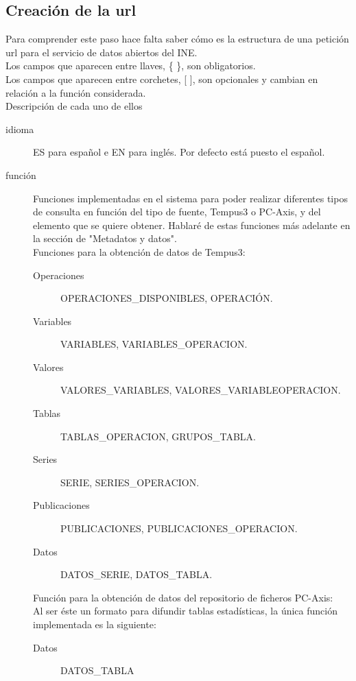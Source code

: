  \subsection{Creación de la url}
 Para comprender este paso hace falta saber cómo es la estructura de una petición url para el servicio de datos abiertos del INE. \cite{ine:urljson}\\
Los campos que aparecen entre llaves, \{ \}, son obligatorios.\\
Los campos que aparecen entre corchetes, [ ], son opcionales y cambian en relación a la función considerada.\\
Descripción de cada uno de ellos
\begin{description}
	\item [idioma] ES para español e EN para inglés. Por defecto está puesto el español.\\
	\item [función] Funciones implementadas en el sistema para poder realizar diferentes tipos de consulta en función del tipo de fuente, Tempus3 o PC-Axis, y del elemento que se quiere obtener. Hablaré de estas funciones más adelante en la sección de "Metadatos y datos".\\
    Funciones para la obtención de datos de Tempus3:
         \begin{description}
         \item [Operaciones] OPERACIONES\_DISPONIBLES, OPERACIÓN.
         \item [Variables] VARIABLES, VARIABLES\_OPERACION.
         \item [Valores] VALORES\_VARIABLES, VALORES\_VARIABLEOPERACION.
         \item [Tablas] TABLAS\_OPERACION, GRUPOS\_TABLA.
         \item [Series] SERIE, SERIES\_OPERACION.
         \item [Publicaciones] PUBLICACIONES, PUBLICACIONES\_OPERACION.
         \item [Datos] DATOS\_SERIE, DATOS\_TABLA.
         \end{description}
    Función para la obtención de datos del repositorio de ficheros PC-Axis:\\ Al ser éste un formato para difundir tablas estadísticas, la única función implementada es la siguiente:
         \begin{description}
         \item [Datos] DATOS\_TABLA
         \end{description}

\end{description}
